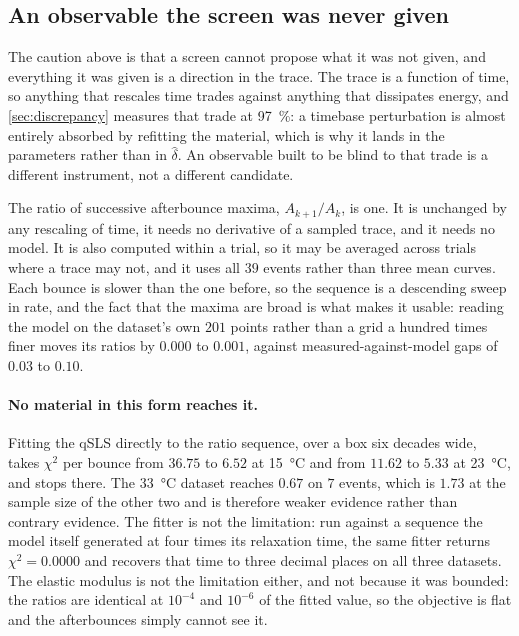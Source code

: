 \documentclass[10pt]{article}
\begin{document}
\subsection*{An observable the screen was never given}
\label{sec:afterbounce}

The caution above is that a screen cannot propose what it was not given, and everything it
was given is a direction in the trace. The trace is a function of time, so anything that
rescales time trades against anything that dissipates energy, and \cref{sec:discrepancy}
measures that trade at \SI{97}{\percent}: a timebase perturbation is almost entirely absorbed
by refitting the material, which is why it lands in the parameters rather than in
$\hat\delta$. An observable built to be blind to that trade is a different instrument, not a
different candidate.

The ratio of successive afterbounce maxima, $A_{k+1}/A_k$, is one. It is unchanged by any
rescaling of time, it needs no derivative of a sampled trace, and it needs no model. It is
also computed within a trial, so it may be averaged across trials where a trace may not, and
it uses all $39$ events rather than three mean curves. Each bounce is slower than the one
before, so the sequence is a descending sweep in rate, and the fact that the maxima are broad
is what makes it usable: reading the model on the dataset's own $201$ points rather than a
grid a hundred times finer moves its ratios by $0.000$ to $0.001$, against
measured-against-model gaps of $0.03$ to $0.10$.

\paragraph{No material in this form reaches it.} Fitting the qSLS directly to the ratio
sequence, over a box six decades wide, takes $\chi^2$ per bounce from $36.75$ to $6.52$ at
\SI{15}{\celsius} and from $11.62$ to $5.33$ at \SI{23}{\celsius}, and stops there. The
\SI{33}{\celsius} dataset reaches $0.67$ on $7$ events, which is $1.73$ at the sample size of
the other two and is therefore weaker evidence rather than contrary evidence. The fitter is
not the limitation: run against a sequence the model itself generated at four times its
relaxation time, the same fitter returns $\chi^2 = 0.0000$ and recovers that time to three
decimal places on all three datasets. The elastic modulus is not the limitation either, and
not because it was bounded: the ratios are identical at $10^{-4}$ and $10^{-6}$ of the fitted
value, so the objective is flat and the afterbounces simply cannot see it.
\end{document}
